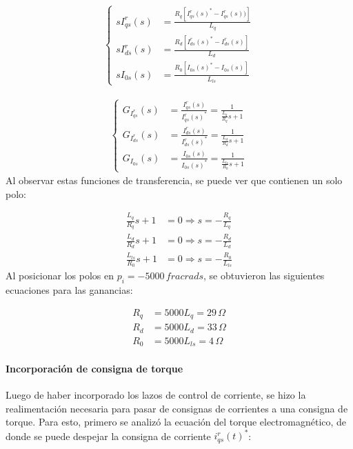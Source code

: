 \documentclass[a4paper, 10pt, onecolumn,journal]{ieeeconf}
\begin{document}
\begin{align}
	\begin{cases}
		s{I}^r_{qs}(s) &= \frac{ R_q \left[ {I^r_{qs}(s)}^* - I^r_{qs}(s))\right]}{L_q}\\
		s{I}^r_{ds}(s) &= \frac{R_d \left[ {I^r_{ds}(s)}^* - I^r_{ds}(s) \right]}{L_d} \\ 
		s{I}_{0s}(s)   &= \frac{R_0 \left[ {I_{0s}(s)}^* - I_{0s}(s) \right]}{L_{ls}}
	\end{cases}	\label{Ecuaciones Laplace lazos de control de corriente}
\end{align}

\begin{align}
	\begin{cases}
		G_{{I}^r_{qs}}(s) &=\frac{{I}^r_{qs}(s)}{{I^r_{qs}(s)}^*} =\frac{1}{\frac{L_q}{R_q} s + 1}\\
		G_{{I}^r_{ds}}(s) &=\frac{{I}^r_{ds}(s)}{{I^r_{ds}(s)}^*} = \frac{1}{\frac{L_d}{R_d} s + 1}\\ 
		G_{{I}_{0s}}(s)   &=\frac{{I}_{0s}(s)}{{I_{0s}(s)}^*} = \frac{1}{\frac{L_{ls}}{R_0} s + 1}
	\end{cases}	\label{Funciones de Transferencia de lazos de control de corriente}
\end{align}
Al observar estas funciones de transferencia, se puede ver que contienen un solo polo:

\begin{align}
	\frac{L_q}{R_q} s + 1 &= 0 \Rightarrow s = -\frac{R_q}{L_q}\\
	\frac{L_{d}}{R_d} s + 1 &=0 \Rightarrow s = -\frac{R_d}{L_d}\\ 
	\frac{L_{ls}}{R_0} s + 1  &=0 \Rightarrow s = -\frac{R_0}{L_{ls}}
\end{align}
Al posicionar los polos en $p_{i}=-5000 \, frac{rad}{s}$, se obtuvieron las siguientes ecuaciones para las ganancias:

\begin{align}
	R_q &= 5000 L_q = 29 \, \Omega\\
	R_d &= 5000 L_d = 33 \, \Omega\\ 
	R_0 &= 5000 L_{ls} = 4 \, \Omega
\end{align}

\paragraph{\textbf{Incorporación de consigna de torque}}
Luego de haber incorporado los lazos de control de corriente, se hizo la realimentación necesaria para pasar de consignas de corrientes a una consigna de torque. Para esto, primero se analizó la ecuación del torque electromagnético, de donde se puede despejar la consigna de corriente ${i^r_{qs}(t)}^*$:
\end{document}
